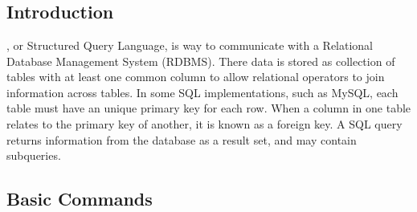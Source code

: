 \chapter{\sql}
\label{sql}

\section{Introduction}
\label{sql:intro}

\sql, or Structured Query Language, is way to
communicate with a Relational Database Management System (RDBMS).
There data is stored as collection of tables with
at least one common column to allow relational operators
to join information across tables.
In some SQL implementations, such as MySQL, each table must have an unique primary key for each row.
When a column in one table relates to the primary key of another, it is known as a foreign key.
A SQL query returns information from the database as a result set, and may contain subqueries.

\section{Basic Commands}
\label{sql:basic}

